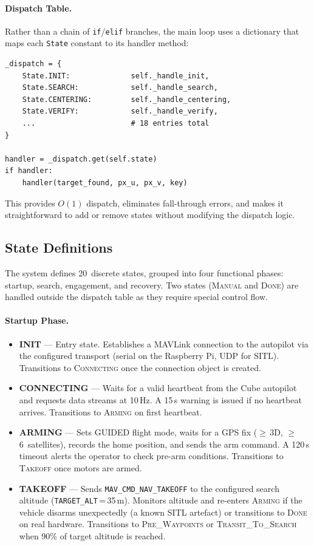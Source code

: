 \paragraph{Dispatch Table.}
Rather than a chain of \texttt{if}/\texttt{elif} branches, the main loop uses a dictionary that maps each \texttt{State} constant to its handler method:

\begin{verbatim}
_dispatch = {
    State.INIT:              self._handle_init,
    State.SEARCH:            self._handle_search,
    State.CENTERING:         self._handle_centering,
    State.VERIFY:            self._handle_verify,
    ...                      # 18 entries total
}

handler = _dispatch.get(self.state)
if handler:
    handler(target_found, px_u, px_v, key)
\end{verbatim}

\noindent This provides $O(1)$ dispatch, eliminates fall-through errors, and makes it straightforward to add or remove states without modifying the dispatch logic.

\subsection{State Definitions}\label{subsec:states}

The system defines 20~discrete states, grouped into four functional phases: startup, search, engagement, and recovery. Two states (\textsc{Manual} and \textsc{Done}) are handled outside the dispatch table as they require special control flow.

\paragraph{Startup Phase.}
\begin{itemize}
    \item \textbf{INIT} --- Entry state. Establishes a MAVLink connection to the autopilot via the configured transport (serial on the Raspberry Pi, UDP for SITL). Transitions to \textsc{Connecting} once the connection object is created.
    \item \textbf{CONNECTING} --- Waits for a valid heartbeat from the Cube autopilot and requests data streams at 10\,Hz. A 15\,s warning is issued if no heartbeat arrives. Transitions to \textsc{Arming} on first heartbeat.
    \item \textbf{ARMING} --- Sets GUIDED flight mode, waits for a GPS fix ($\geq$\,3D, $\geq$\,6~satellites), records the home position, and sends the arm command. A 120\,s timeout alerts the operator to check pre-arm conditions. Transitions to \textsc{Takeoff} once motors are armed.
    \item \textbf{TAKEOFF} --- Sends \texttt{MAV\_CMD\_NAV\_TAKEOFF} to the configured search altitude (\texttt{TARGET\_ALT}\,=\,35\,m). Monitors altitude and re-enters \textsc{Arming} if the vehicle disarms unexpectedly (a known SITL artefact) or transitions to \textsc{Done} on real hardware. Transitions to \textsc{Pre\_Waypoints} or \textsc{Transit\_To\_Search} when 90\% of target altitude is reached.
\end{itemize}

